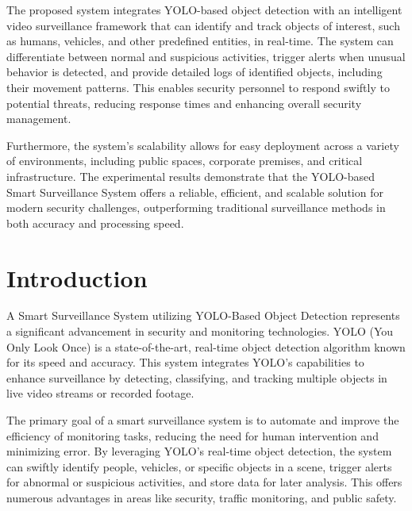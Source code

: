 \documentclass[openany,12pt]{report}
\begin{document}
The proposed system integrates YOLO-based object detection with an intelligent video surveillance framework that can identify and track objects of interest, such as humans, vehicles, and other predefined entities, in real-time. The system can differentiate between normal and suspicious activities, trigger alerts when unusual behavior is detected, and provide detailed logs of identified objects, including their movement patterns. This enables security personnel to respond swiftly to potential threats, reducing response times and enhancing overall security management.

Furthermore, the system's scalability allows for easy deployment across a variety of environments, including public spaces, corporate premises, and critical infrastructure. The experimental results demonstrate that the YOLO-based Smart Surveillance System offers a reliable, efficient, and scalable solution for modern security challenges, outperforming traditional surveillance methods in both accuracy and processing speed.



\newpage
\tableofcontents
\listoffigures

\newpage	
{}





\chapter{Introduction}
\hspace*{0.5in}A Smart Surveillance System utilizing YOLO-Based Object Detection represents a significant advancement in security and monitoring technologies. YOLO (You Only Look Once) is a state-of-the-art, real-time object detection algorithm known for its speed and accuracy. This system integrates YOLO's capabilities to enhance surveillance by detecting, classifying, and tracking multiple objects in live video streams or recorded footage.

The primary goal of a smart surveillance system is to automate and improve the efficiency of monitoring tasks, reducing the need for human intervention and minimizing error. By leveraging YOLO’s real-time object detection, the system can swiftly identify people, vehicles, or specific objects in a scene, trigger alerts for abnormal or suspicious activities, and store data for later analysis. This offers numerous advantages in areas like security, traffic monitoring, and public safety.
\end{document}
